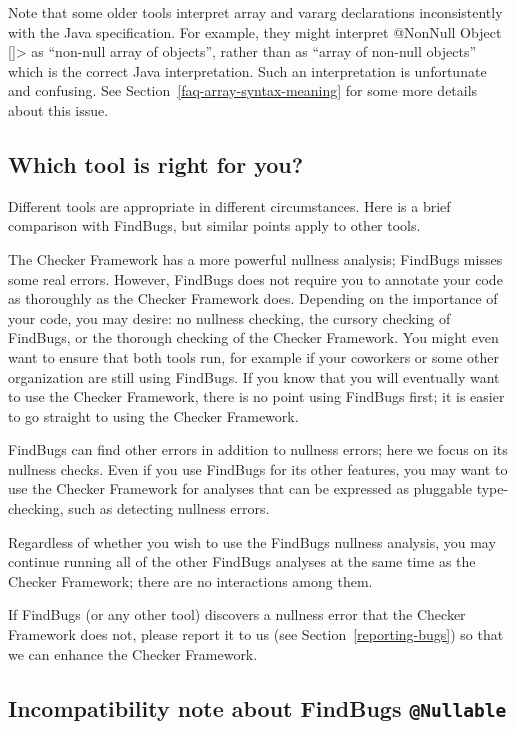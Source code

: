 Note that some older tools interpret array and vararg declarations
inconsistently with the Java specification.  For example, they might
interpret \<@NonNull Object []> as ``non-null array of objects'', rather
than as ``array of non-null objects'' which is the correct Java
interpretation.  Such an interpretation is unfortunate and confusing.  See
Section~\ref{faq-array-syntax-meaning} for some more details about this
issue.


\subsection{Which tool is right for you?\label{choosing-nullness-tool}}

Different tools are appropriate in different circumstances.  Here is a
brief comparison with FindBugs, but similar points apply to other tools.

The Checker Framework has a more powerful nullness analysis; FindBugs misses
some real
errors.  However, FindBugs does not require you to annotate your code as
thoroughly as the Checker Framework does.  Depending on the importance of
your code, you may desire:  no nullness checking, the cursory checking of
FindBugs, or the thorough checking of the Checker Framework.  You might
even want to ensure that both tools run, for example if your coworkers or
some other organization are still using FindBugs.  If you know that you
will eventually want to use the Checker Framework, there is no point using
FindBugs first; it is easier to go straight to using the Checker Framework.

FindBugs can find other errors in addition to nullness errors; here
we focus on its nullness checks.  Even if you use FindBugs for its other
features, you may want to use the Checker Framework for analyses that can
be expressed as pluggable type-checking, such as detecting nullness errors.

Regardless of whether you wish to use the FindBugs nullness analysis, you
may continue running all of the other FindBugs analyses at the same time as
the Checker Framework; there are no interactions among them.

If FindBugs (or any other tool) discovers a nullness error that the Checker
Framework does not, please report it to us (see
Section~\ref{reporting-bugs}) so that we can enhance the Checker Framework.



\subsection{Incompatibility note about FindBugs \tt{@Nullable}\label{findbugs-nullable}}

